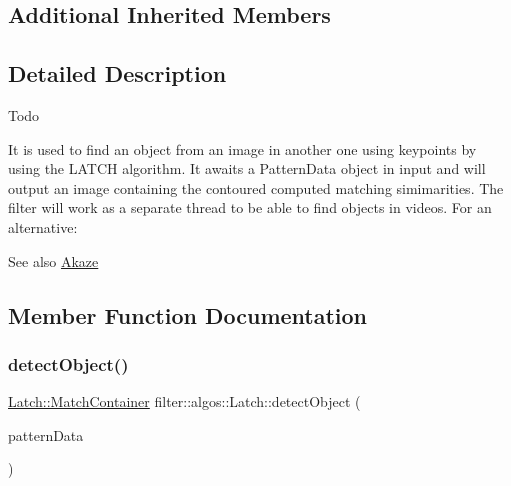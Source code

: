 \subsection*{Additional Inherited Members}


\subsection{Detailed Description}
\begin{DoxyRefDesc}{Todo}
\item[\hyperlink{todo__todo000010}{Todo}]\end{DoxyRefDesc}
It is used to find an object from an image in another one using keypoints by using the L\+A\+T\+CH algorithm. It awaits a Pattern\+Data object in input and will output an image containing the contoured computed matching simimarities. The filter will work as a separate thread to be able to find objects in videos. For an alternative\+: \begin{DoxySeeAlso}{See also}
\hyperlink{classfilter_1_1algos_1_1_akaze}{Akaze} 
\end{DoxySeeAlso}


\subsection{Member Function Documentation}
\mbox{\label{classfilter_1_1algos_1_1_latch_a7c01fdef12787d0b52abe4b0b023ac29}} 
\subsubsection{\texorpdfstring{detect\+Object()}{detectObject()}}
{\footnotesize\ttfamily \hyperlink{classfilter_1_1algos_1_1_latch_1_1_match_container}{Latch\+::\+Match\+Container} filter\+::algos\+::\+Latch\+::detect\+Object (\begin{DoxyParamCaption}\item[{\hyperlink{classfilter_1_1data_1_1_pattern_data}{data\+::\+Pattern\+Data} \&}]{pattern\+Data }\end{DoxyParamCaption})\hspace{0.3cm}{\ttfamily [private]}}


